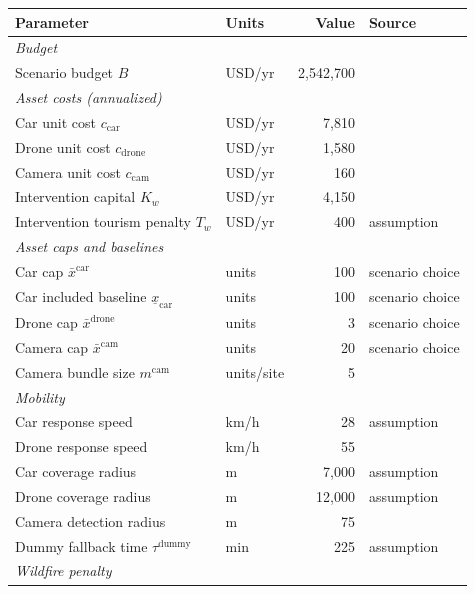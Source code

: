 \begin{table}[H]
\centering
\small
\begin{tabular}{llrl}
\hline
\textbf{Parameter} & \textbf{Units} & \textbf{Value} & \textbf{Source} \\
\hline
\multicolumn{4}{l}{\textit{Budget}} \\
Scenario budget $B$ & USD/yr & 2{,}542{,}700 & \cite{namibian2025budget} \\[3pt]
\multicolumn{4}{l}{\textit{Asset costs (annualized)}} \\
Car unit cost $c_{\mathrm{car}}$ & USD/yr & 7{,}810 & \cite{pupkewitz_hilux} \\
Drone unit cost $c_{\mathrm{drone}}$ & USD/yr & 1{,}580 & \cite{dji_matrice4_store} \\
Camera unit cost $c_{\mathrm{cam}}$ & USD/yr & 160 & \cite{reconyx_hyperfire4k,reconyx_cellplan} \\
Intervention capital $K_w$ & USD/yr & 4{,}150 & \cite{meft_boreholes_2025} \\
Intervention tourism penalty $T_w$ & USD/yr & 400 & assumption \\[3pt]
\multicolumn{4}{l}{\textit{Asset caps and baselines}} \\
Car cap $\bar{x}^{\mathrm{car}}$ & units & 100 & scenario choice \\
Car included baseline $\underline{x}_{\mathrm{car}}$ & units & 100 & scenario choice \\
Drone cap $\bar{x}^{\mathrm{drone}}$ & units & 3 & scenario choice \\
Camera cap $\bar{x}^{\mathrm{cam}}$ & units & 20 & scenario choice \\
Camera bundle size $m^{\mathrm{cam}}$ & units/site & 5 & \cite{nwr_live_camera} \\[3pt]
\multicolumn{4}{l}{\textit{Mobility}} \\
Car response speed & km/h & 28 & assumption \\
Drone response speed & km/h & 55 & \cite{dji_matrice4_specs} \\
Car coverage radius & m & 7{,}000 & assumption \\
Drone coverage radius & m & 12{,}000 & assumption \\
Camera detection radius & m & 75 & \cite{reconyx_hyperfire4k} \\
Dummy fallback time $\tau^{\mathrm{dummy}}$ & min & 225 & assumption \\[3pt]
\multicolumn{4}{l}{\textit{Wildfire penalty}} \\

\end{tabular}
\end{table}
